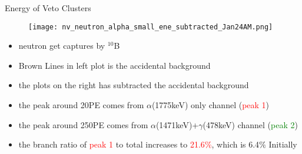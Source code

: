 \documentclass[9pt]{beamer}
\begin{document}
\begin{frame}{Energy of Veto Clusters}
\begin{figure}
\texttt{[image: nv\_neutron\_alpha\_small\_ene\_subtracted\_Jan24AM.png]}
\end{figure}
\begin{itemize}
[bullet]
\item neutron get captures by $^{10}$B
\item Brown Lines in left plot is the accidental background 
\item the plots on the right has subtracted the accidental background 
\item the peak around 20PE comes from $\alpha$(1775keV) only channel (\textcolor{red}{peak 1})
\item the peak around 250PE comes from $\alpha$(1471keV)+$\gamma$(478keV) channel (\textcolor{green}{peak 2})
\item the branch ratio of \textcolor{red}{peak 1} to total increases to \textcolor{red}{21.6$\%$}, which is 6.4$\%$ Initially 
\end{itemize}
\end{frame}

\end{document}
